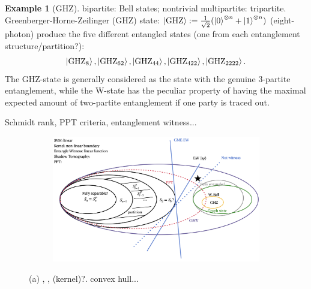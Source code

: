 \documentclass[
10pt,
aps,
pra,
linenumbers,
floatfix,
]{revtex4-2}
\theoremstyle{plain}
\theoremstyle{definition}
\newtheorem{example}{Example}
\newcommand{\ghz}{\text{GHZ}}
\begin{document}
\begin{example}[GHZ]\label{exm:ghz}
	bipartite: Bell states;
	nontrivial multipartite: tripartite.
	Greenberger-Horne-Zeilinger (GHZ) state: $\ket{\ghz}:=\frac{1}{\sqrt{2}}(\ket{0}^{\otimes n} + \ket{1}^{\otimes n} )$ (eight-photon) produce the five different entangled states (one from each entanglement structure/partition?): 
	\begin{equation*}
		\ket{\ghz_8},\ket{\ghz_{62}},\ket{\ghz_{44}},\ket{\ghz_{422}},\ket{\ghz_{2222}}.
	\end{equation*}
	The GHZ-state is generally considered as the state with the genuine 3-partite entanglement, while the W-state has the peculiar property of having the maximal expected amount of two-partite entanglement if one party is traced out.

	Schmidt rank, PPT criteria, entanglement witness...
\end{example}

\begin{figure}[!ht]
	\centering
	\begin{subfigure}{0.6\textwidth}
		\centering
		\includegraphics[width=.9\linewidth]{diagram.png}
	\end{subfigure}
	\caption{(a) , ,  (kernel)?. convex hull... }
	\label{fig:entangle}
\end{figure}
\end{document}
